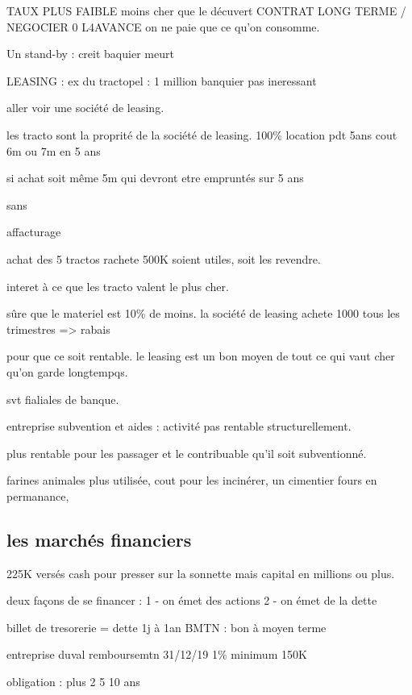 \documentclass[a4paper,12pt]{article}
\begin{document}
TAUX PLUS FAIBLE moins cher que le décuvert
CONTRAT LONG TERME / NEGOCIER 0 L4AVANCE 
on ne paie que ce qu'on consomme.


Un stand-by : creit baquier meurt



LEASING : 
ex du tractopel : 1 million
banquier pas ineressant

aller voir une société de leasing.

les tracto sont la proprité de la société de leasing. 100\%
location pdt 5ans  cout 6m ou 7m en 5 ans

si achat soit même 5m qui devront etre empruntés sur 5 ans

sans 

affacturage


achat des 5 tractos rachete 500K soient utiles, soit les revendre.

interet à ce que les tracto valent le plus cher.

sûre que le materiel est 10\% de moins. la société de leasing achete 1000 tous les trimestres => rabais

pour que ce soit rentable. le leasing est un bon moyen de tout ce qui vaut cher qu'on garde longtempqs.

svt fialiales de banque.



entreprise subvention et aides : activité pas rentable structurellement.

plus rentable pour les passager et le contribuable qu'il soit subventionné.



farines animales plus utilisée, cout pour les incinérer, un cimentier fours en permanance,


\subsection{les marchés financiers} 

225K versés cash pour presser sur la sonnette mais capital en millions ou plus.

deux façons de se financer :
 1 - on émet des actions 
 2 - on émet de la dette
 
 billet de tresorerie = dette 1j à 1an
 BMTN : bon à moyen terme
 
 entreprise duval remboursemtn 31/12/19 1\% minimum 150K
 
 
 obligation : plus 2 5  10 ans
%
\end{document}
